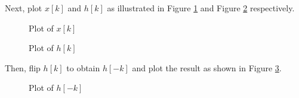 \documentclass[fleqn]{article}
\begin{document}
\begin{enumerate}[nolistsep]
		Next, plot $x[k]$ and $h[k]$ as illustrated in Figure \ref{prob1_xk_plot} and Figure \ref{prob1_hk_plot} respectively. 
		
		\begin{figure}[H]				
			\centerline{}
			\caption{Plot of $x[k]$}
			\label{prob1_xk_plot}
		\end{figure}
		
		\begin{figure}[H]				
			\centerline{}
			\caption{Plot of $h[k]$}
			\label{prob1_hk_plot}
		\end{figure}
		
		Then, flip $h[k]$ to obtain $h[-k]$ and plot the result as shown in Figure \ref{prob1_h-k_plot}.
		
		\begin{figure}[H]				
			\centerline{}
			\caption{Plot of $h[-k]$}
			\label{prob1_h-k_plot}
		\end{figure}
		

\end{enumerate}
\end{document}
